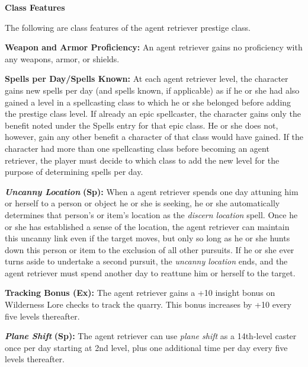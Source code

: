 \documentclass{article}
\begin{document}
\vspace{12pt}
\textbf{Class Features}

The following are class features of the agent retriever prestige class. 

\textbf{Weapon and Armor Proficiency:} An agent retriever gains no proficiency 
with any weapons, armor, or shields. 

\textbf{Spells per Day/Spells Known:} At each agent retriever level, the character 
gains new spells per day (and spells known, if applicable) as if he or she had 
also gained a level in a spellcasting class to which he or she belonged before 
adding the prestige class level. If already an epic spellcaster, the character 
gains only the benefit noted under the Spells entry for that epic class. He or 
she does not, however, gain any other benefit a character of that class would have 
gained. If the character had more than one spellcasting class before becoming an 
agent retriever, the player must decide to which class to add the new level for 
the purpose of determining spells per day. 

\textit{\textbf{Uncanny Location }}\textbf{(Sp):} When a agent retriever spends 
one day attuning him or herself to a person or object he or she is seeking, he 
or she automatically determines that person's or item's location as the \textit{discern 
location }spell. Once he or she has established a sense of the location, the agent 
retriever can maintain this uncanny link even if the target moves, but only so 
long as he or she hunts down this person or item to the exclusion of all other 
pursuits. If he or she ever turns aside to undertake a second pursuit, the \textit{uncanny 
location }ends, and the agent retriever must spend another day to reattune him 
or herself to the target. 

\textbf{Tracking Bonus (Ex):} The agent retriever gains a +10 insight bonus on 
Wilderness Lore checks to track the quarry. This bonus increases by +10 every five 
levels thereafter. 

\textit{\textbf{Plane Shift }}\textbf{(Sp):} The agent retriever can use \textit{plane 
shift }as a 14th-level caster once per day starting at 2nd level, plus one additional 
time per day every five levels thereafter. 
\end{document}
